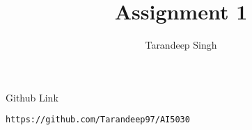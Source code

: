 \documentclass[journal,12pt,twocolumn]{IEEEtran}
\DeclareMathOperator*{\Res}{Res}
\begin{document}
\newtheorem{theorem}{Theorem}[section]
\newtheorem{problem}{Problem}
\newtheorem{proposition}{Proposition}[section]
\newtheorem{lemma}{Lemma}[section]
\newtheorem{corollary}[theorem]{Corollary}
\newtheorem{example}{Example}[section]
\newtheorem{definition}[problem]{Definition}

\newcommand{\BEQA}{\begin{eqnarray}}
\newcommand{\EEQA}{\end{eqnarray}}
\newcommand{\define}{\stackrel{\triangle}{=}}

\raggedbottom
\setlength{\parindent}{0pt}
\providecommand{\mbf}{\mathbf}
\providecommand{\pr}[1]{\ensuremath{\Pr\left(#1\right)}}
\providecommand{\qfunc}[1]{\ensuremath{Q\left(#1\right)}}
\providecommand{\sbrak}[1]{\ensuremath{{}\left[#1\right]}}
\providecommand{\lsbrak}[1]{\ensuremath{{}\left[#1\right.}}
\providecommand{\rsbrak}[1]{\ensuremath{{}\left.#1\right]}}
\providecommand{\brak}[1]{\ensuremath{\left(#1\right)}}
\providecommand{\lbrak}[1]{\ensuremath{\left(#1\right.}}
\providecommand{\rbrak}[1]{\ensuremath{\left.#1\right)}}
\providecommand{\cbrak}[1]{\ensuremath{\left\{#1\right\}}}
\providecommand{\lcbrak}[1]{\ensuremath{\left\{#1\right.}}
\providecommand{\rcbrak}[1]{\ensuremath{\left.#1\right\}}}
\theoremstyle{remark}
\newtheorem{rem}{Remark}
\newcommand{\sgn}{\mathop{\mathrm{sgn}}}
\providecommand{\abs}[1]{\left\vert#1\right\vert}
\providecommand{\res}[1]{\Res\displaylimits_{#1}} 
\providecommand{\norm}[1]{\left\lVert#1\right\rVert}
\providecommand{\mtx}[1]{\mathbf{#1}}
\providecommand{\mean}[1]{E\left[ #1 \right]}
\providecommand{\fourier}{\overset{\mathcal{F}}{ \rightleftharpoons}}
\providecommand{\system}{\overset{\mathcal{H}}{ \longleftrightarrow}}
\newcommand{\solution}{\noindent \textbf{Solution: }}
\newcommand{\cosec}{\,\text{cosec}\,}
\providecommand{\dec}[2]{\ensuremath{\overset{#1}{\underset{#2}{\gtrless}}}}
\newcommand{\myvec}[1]{\ensuremath{\begin{pmatrix}#1\end{pmatrix}}}
\newcommand{\mydet}[1]{\ensuremath{\begin{vmatrix}#1\end{vmatrix}}}
\makeatletter
{}
\makeatother
\let\StandardTheFigure\thefigure
\let\vec\mathbf
\renewcommand{\thefigure}{\theproblem}
\def\putbox#1#2#3{\makebox[0in][l]{\makeb
ox[#1][l]{}\raisebox{\baselineskip}[0in][0in]{\raisebox{#2}[0in][0in]{#3}}}}
     \def\rightbox#1{\makebox[0in][r]{#1}}
     \def\centbox#1{\makebox[0in]{#1}}
     \def\topbox#1{\raisebox{-\baselineskip}[0in][0in]{#1}}
     \def\midbox#1{\raisebox{-0.5\baselineskip}[0in][0in]{#1}}
\vspace{3cm}
\title{Assignment 1}
\author{Tarandeep Singh}
\maketitle
\newpage
\bigskip
\renewcommand{\thefigure}{\theenumi}
\renewcommand{\thetable}{\theenumi}
Github Link
\begin{lstlisting}
https://github.com/Tarandeep97/AI5030
\end{lstlisting}
\end{document}
